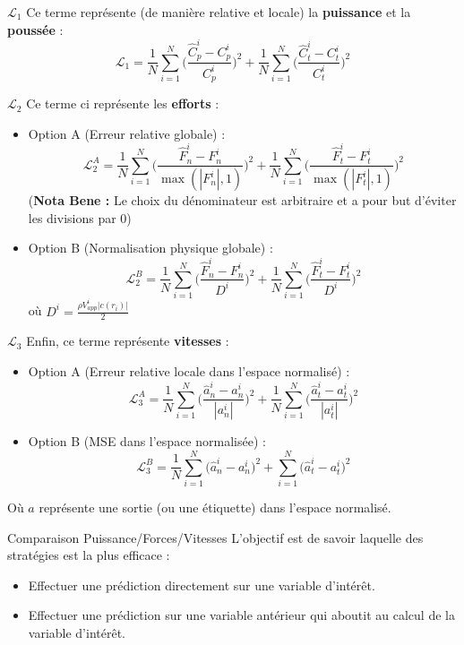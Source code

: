 \documentclass[
11pt,notheorems,hyperref={pdfauthor=whatever}
]{beamer}
\begin{document}
\begin{frame}{$\mathcal{L}_1$}
    Ce terme représente (de manière relative et locale) la \textbf{puissance} et la \textbf{poussée} : 
    \[
    \mathcal{L}_1 = \frac{1}{N}\sum_{i=1}^N \Big(\frac{\hat{C}_{p}^i - C_p^i}{C_p^i}\Big)^2 + \frac{1}{N}\sum_{i=1}^N \Big(\frac{\hat{C}_{t}^i - C_t^i}{C_t^i}\Big)^2
    \]

\end{frame}

\begin{frame}{$\mathcal{L}_2$}
    Ce terme ci représente les \textbf{efforts} : 
    \begin{itemize}
        \item Option A (Erreur relative globale) : \[
            \mathcal{L}_2^A =  \frac{1}{N}\sum_{i=1}^N \Big(\frac{\hat{F}_{n}^i - F_n^i}{\max(| F_n^i |, 1)}\Big)^2 + \frac{1}{N}\sum_{i=1}^N  \Big(\frac{\hat{F}_{t}^i - F_t^i}{\max(|F_t^i|,1)}\Big)^2
        \]
        (\textbf{Nota Bene : } Le choix du dénominateur est arbitraire et a pour but d'éviter les divisions par 0)
        \item Option B (Normalisation physique globale) : \[
            \mathcal{L}_2^B =  \frac{1}{N}\sum_{i=1}^N \Big(\frac{\hat{F}_{n}^i - F_n^i}{ D^i }\Big)^2 + \frac{1}{N}\sum_{i=1}^N  \Big(\frac{\hat{F}_{t}^i - F_t^i}{D^i}\Big)^2
        \]
        où $D^i = \frac{\rho V_{app}^i |c(r_i)|}{2}$
    \end{itemize}
\end{frame}

\begin{frame}{$\mathcal{L}_3$}
    Enfin, ce terme représente \textbf{vitesses} :
    \begin{itemize}
        \item Option A (Erreur relative locale dans l'espace normalisé) :\[
            \mathcal{L}_3^A =  \frac{1}{N}\sum_{i=1}^N \Big(\frac{\hat{a}_{n}^i - a_n^i}{| a_n^i |}\Big)^2 + \frac{1}{N}\sum_{i=1}^N  \Big(\frac{\hat{a}_{t}^i - a_t^i}{|a_t^i|}\Big)^2
        \]
        \item Option B (MSE dans l'espace normalisée) :\[
            \mathcal{L}_3^B = \frac{1}{N}\sum_{i=1}^N  \Big( \hat{a}_{n}^i - a_n^i \Big)^2 + \sum_{i=1}^N  \Big( \hat{a}_{t}^i - a_t^i \Big)^2
        \]
    \end{itemize}
    Où $a$ représente une sortie (ou une étiquette) dans l'espace normalisé.
\end{frame}

\begin{frame}{Comparaison Puissance/Forces/Vitesses}
    L'objectif est de savoir laquelle des stratégies est la plus efficace :
    \begin{itemize}
        \item Effectuer une prédiction directement sur une variable d'intérêt.
        \item Effectuer une prédiction sur une variable antérieur qui aboutit au calcul de la variable d'intérêt.
    \end{itemize}
\end{frame}
\end{document}
